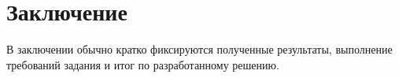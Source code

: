 \section*{Заключение}

В заключении обычно кратко фиксируются полученные результаты,
выполнение требований задания и итог по разработанному решению.
